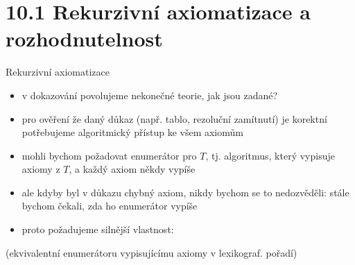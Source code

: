 \documentclass{beamer}
\begin{document}
\section{10.1 Rekurzivní axiomatizace a rozhodnutelnost}


\begin{frame}{Rekurzivní axiomatizace}

    \begin{itemize}
        \item v dokazování povolujeme nekonečné teorie, jak jsou zadané?\pause
        \item pro ověření že daný důkaz (např. tablo, rezoluční zamítnutí) je korektní potřebujeme algoritmický přístup ke všem axiomům\pause
        \item mohli bychom požadovat \alert{enumerátor} pro $T$, tj. algoritmus, který vypisuje axiomy z $T$, a každý axiom někdy vypíše\pause
        \item ale kdyby byl v důkazu chybný axiom, nikdy bychom se to nedozvěděli: stále bychom čekali, zda ho enumerátor vypíše\pause
        \item proto požadujeme silnější vlastnost:
    \end{itemize}

    \pause

    \pause
    (ekvivalentní enumerátoru vypisujícímu axiomy v lexikograf. pořadí)  

\end{frame}
\end{document}
